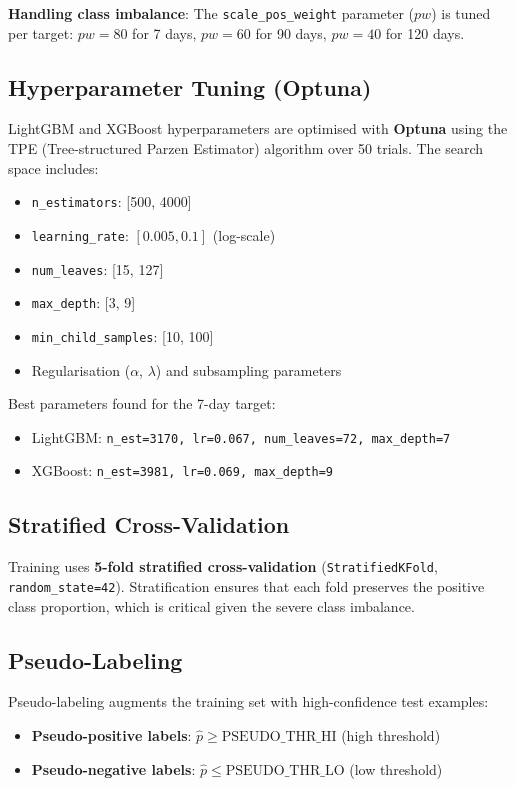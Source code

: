 \documentclass[12pt,a4paper]{article}
\begin{document}
\textbf{Handling class imbalance}: The \texttt{scale\_pos\_weight} parameter ($pw$) is tuned per target: $pw = 80$ for 7 days, $pw = 60$ for 90 days, $pw = 40$ for 120 days.

\subsection{Hyperparameter Tuning (Optuna)}

LightGBM and XGBoost hyperparameters are optimised with \textbf{Optuna} using the TPE (Tree-structured Parzen Estimator) algorithm over 50 trials. The search space includes:

\begin{itemize}[noitemsep]
    \item \texttt{n\_estimators}: [500, 4000]
    \item \texttt{learning\_rate}: $[0.005, 0.1]$ (log-scale)
    \item \texttt{num\_leaves}: [15, 127]
    \item \texttt{max\_depth}: [3, 9]
    \item \texttt{min\_child\_samples}: [10, 100]
    \item Regularisation ($\alpha$, $\lambda$) and subsampling parameters
\end{itemize}

Best parameters found for the 7-day target:
\begin{itemize}[noitemsep]
    \item LightGBM: \texttt{n\_est=3170, lr=0.067, num\_leaves=72, max\_depth=7}
    \item XGBoost: \texttt{n\_est=3981, lr=0.069, max\_depth=9}
\end{itemize}

\subsection{Stratified Cross-Validation}

Training uses \textbf{5-fold stratified cross-validation} (\texttt{StratifiedKFold}, \texttt{random\_state=42}). Stratification ensures that each fold preserves the positive class proportion, which is critical given the severe class imbalance.

\subsection{Pseudo-Labeling}

Pseudo-labeling augments the training set with high-confidence test examples:
\begin{itemize}[noitemsep]
    \item \textbf{Pseudo-positive labels}: $\hat{p} \geq \text{PSEUDO\_THR\_HI}$ (high threshold)
    \item \textbf{Pseudo-negative labels}: $\hat{p} \leq \text{PSEUDO\_THR\_LO}$ (low threshold)
\end{itemize}
\end{document}
